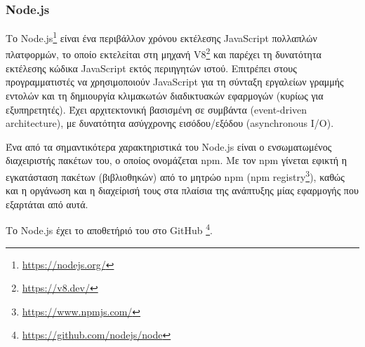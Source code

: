 \subsubsection{Node.js} \label{subsection:4-2-1-1-node.js}


Το Node.js\footnote{\url{https://nodejs.org/}} είναι ένα περιβάλλον χρόνου εκτέλεσης JavaScript πολλαπλών πλατφορμών, το οποίο εκτελείται στη μηχανή V8\footnote{\url{https://v8.dev/}} και παρέχει τη δυνατότητα εκτέλεσης κώδικα JavaScript εκτός περιηγητών ιστού. Επιτρέπει στους προγραμματιστές να χρησιμοποιούν JavaScript για τη σύνταξη εργαλείων γραμμής εντολών και τη δημιουργία κλιμακωτών διαδικτυακών εφαρμογών (κυρίως για εξυπηρετητές). Έχει αρχιτεκτονική βασισμένη σε συμβάντα (event-driven architecture), με δυνατότητα ασύγχρονης εισόδου/εξόδου (asynchronous I/O).\cite{4.2-node.js}

Ένα από τα σημαντικότερα χαρακτηριστικά του Node.js είναι ο ενσωματωμένος διαχειριστής πακέτων του, ο οποίος ονομάζεται npm. Με τον npm γίνεται εφικτή η εγκατάσταση πακέτων (βιβλιοθηκών) από το μητρώο npm (npm registry\footnote{\url{https://www.npmjs.com/}}), καθώς και η οργάνωση και η διαχείρισή τους στα πλαίσια της ανάπτυξης μίας εφαρμογής που εξαρτάται από αυτά.

Το Node.js έχει το αποθετήριό του στο GitHub \footnote{\url{https://github.com/nodejs/node}}.